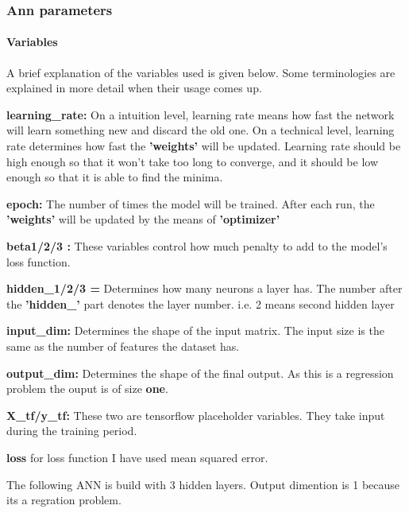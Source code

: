 \documentclass[11pt, a4paper , landscape]{article}
\begin{document}
    \subsubsection{Ann parameters}\label{ann-parameters}

\paragraph{\texorpdfstring{\textbf{Variables}}{Variables}}\label{variables}

A brief explanation of the variables used is given below. Some
terminologies are explained in more detail when their usage comes up.

\textbf{learning\_rate:} On a intuition level, learning rate means how
fast the network will learn something new and discard the old one. On a
technical level, learning rate determines how fast the
\textbf{'weights'} will be updated. Learning rate should be high enough
so that it won't take too long to converge, and it should be low enough
so that it is able to find the minima.

\textbf{epoch:} The number of times the model will be trained. After
each run, the \textbf{'weights'} will be updated by the means of
\textbf{'optimizer'}

\textbf{beta1/2/3 :} These variables control how much penalty to add to
the model's loss function.

\textbf{hidden\_1/2/3 =} Determines how many neurons a layer has. The
number after the \textbf{'hidden\_'} part denotes the layer number. i.e.
2 means second hidden layer

\textbf{input\_dim:} Determines the shape of the input matrix. The input
size is the same as the number of features the dataset has.

\textbf{output\_dim:} Determines the shape of the final output. As this
is a regression problem the ouput is of size \textbf{one}.

\textbf{X\_tf/y\_tf:} These two are tensorflow placeholder variables.
They take input during the training period.

\textbf{loss} for loss function I have used mean squared error.

    The following ANN is build with 3 hidden layers. Output dimention is 1
because its a regration problem.
\end{document}

